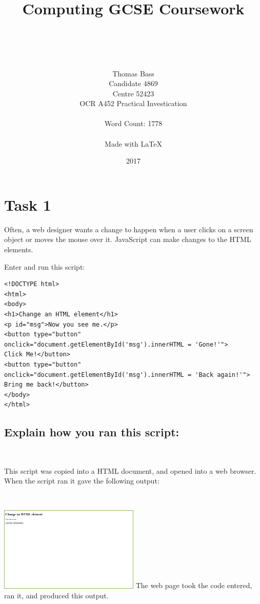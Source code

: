 \documentclass[a4paper]{article}
\title{Computing GCSE Coursework}
\author{\\ \\ \\ \\ Thomas Bass\\Candidate 4869\\Centre 52423\\OCR A452 Practical Investication\\\\Word Count: 1778\\\\Made with \LaTeX}
\date{2017}
\begin{document}
\maketitle
\pagebreak
\renewcommand*\contentsname{Summary}
\tableofcontents
\pagebreak
\section{Task 1}
Often, a web designer wants a change to happen when a user clicks on a screen object or moves the mouse over it. JavaScript can make changes to the HTML elements. \par
\noindent Enter and run this script: \par \par
\begin{lstlisting}
<!DOCTYPE html>
<html>
<body>
<h1>Change an HTML element</h1>
<p id="msg">Now you see me.</p>
<button type="button"
onclick="document.getElementById('msg').innerHTML = 'Gone!'">
Click Me!</button>
<button type="button"
onclick="document.getElementById('msg').innerHTML = 'Back again!'">
Bring me back!</button>
</body>
</html>
\end{lstlisting}
\subsection{Explain how you ran this script:} ~\par	
This script was copied into a HTML document, and opened into a web browser. 
When the script ran it gave the following output: ~\par ~\par
\noindent\includegraphics[width=0.5\textwidth, left, width=\linewidth, frame]{Picture1.png}
The web page took the code entered, ran it, and produced this output.
\newpage
\end{document}
